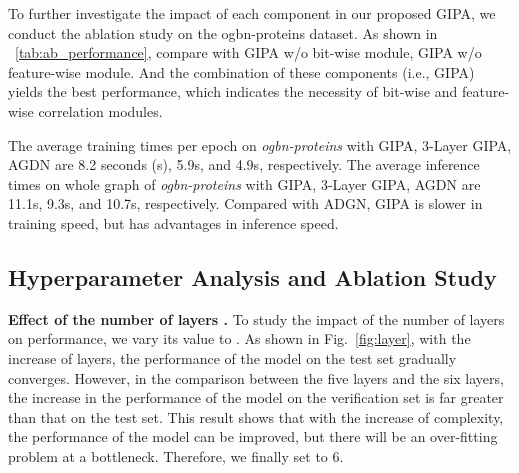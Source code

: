 \documentclass[runningheads]{llncs}
\newcommand{\model}{GIPA\xspace}
\begin{document}
To further investigate the impact of each component in our proposed \model, we conduct the ablation study on the ogbn-proteins dataset. 
As shown in \tablename~\ref{tab:ab_performance}, compare with \model w/o bit-wise module, \model w/o feature-wise module. And the combination of these components (i.e., \model) yields the best performance, which indicates the necessity of bit-wise and feature-wise correlation modules.

The average training times per epoch on \textit{ogbn-proteins} with \model, 3-Layer \model, AGDN are 8.2 seconds (s), 5.9s, and 4.9s, respectively. 
The average inference times on whole graph of \textit{ogbn-proteins} with \model, 3-Layer \model, AGDN  are 11.1s, 9.3s, and 10.7s, respectively. 
Compared with ADGN, \model is slower in training speed, but has advantages in inference speed.


\subsection{Hyperparameter Analysis and Ablation Study}\label{Hyperparameter}
\noindent \textbf{Effect of the number of layers .} To study the impact of the number of layers  on performance, we vary its value to . As shown in Fig.~\ref{fig:layer}, with the increase of layers, the performance of the model on the test set gradually converges. However, in the comparison between the five layers and the six layers, the increase in the performance of the model on the verification set is far greater than that on the test set. This result shows that with the increase of complexity, the performance of the model can be improved, but there will be an over-fitting problem at a bottleneck. Therefore, we finally set  to 6.
\end{document}
